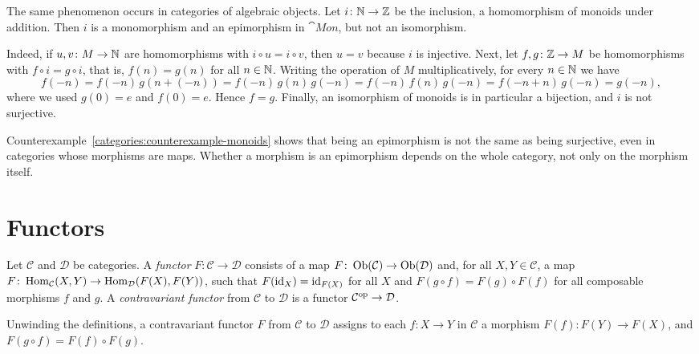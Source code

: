 \begin{counterexample}\label{categories:counterexample-monoids}
The same phenomenon occurs in categories of algebraic objects. Let
$i \colon \mathbb{N} \to \mathbb{Z}$ be the inclusion, a homomorphism of monoids under
addition. Then $i$ is a monomorphism and an epimorphism in $\cat{Mon}$, but
not an isomorphism.

Indeed, if $u, v \colon M \to \mathbb{N}$ are homomorphisms with $i \circ u = i \circ v$,
then $u = v$ because $i$ is injective. Next, let $f, g \colon \mathbb{Z} \to M$ be
homomorphisms with $f \circ i = g \circ i$, that is, $f(n) = g(n)$ for all
$n \in \mathbb{N}$. Writing the operation of $M$ multiplicatively, for every
$n \in \mathbb{N}$ we have
\[
f(-n) = f(-n) \, g(n + (-n)) = f(-n) \, g(n) \, g(-n)
= f(-n) \, f(n) \, g(-n) = f(-n + n) \, g(-n) = g(-n),
\]
where we used $g(0) = e$ and $f(0) = e$. Hence $f = g$. Finally, an isomorphism
of monoids is in particular a bijection, and $i$ is not surjective.
\end{counterexample}

\begin{remark}\label{categories:remark-epi-not-surjective}
Counterexample~\ref{categories:counterexample-monoids} shows that being an
epimorphism is not the same as being surjective, even in categories whose
morphisms are maps. Whether a morphism is an epimorphism depends on the whole
category, not only on the morphism itself.
\end{remark}

\section{Functors}\label{categories:section-functors}

\begin{definition}\label{categories:definition-functor}
Let $\mathcal{C}$ and $\mathcal{D}$ be categories. A \emph{functor}
$F \colon \mathcal{C} \to \mathcal{D}$ consists of a map
$F \colon \operatorname{Ob}(\mathcal{C}) \to \operatorname{Ob}(\mathcal{D})$ and, for all
$X, Y \in \mathcal{C}$, a map
$F \colon \operatorname{Hom}_{\mathcal{C}}(X, Y) \to \operatorname{Hom}_{\mathcal{D}}(F(X), F(Y))$, such
that $F(\mathrm{id}_X) = \mathrm{id}_{F(X)}$ for all $X$ and $F(g \circ f) = F(g) \circ F(f)$
for all composable morphisms $f$ and $g$. A \emph{contravariant functor} from
$\mathcal{C}$ to $\mathcal{D}$ is a functor
$\mathcal{C}^{\mathrm{op}} \to \mathcal{D}$.
\end{definition}

\begin{remark}\label{categories:remark-contravariant}
Unwinding the definitions, a contravariant functor $F$ from $\mathcal{C}$ to
$\mathcal{D}$ assigns to each $f \colon X \to Y$ in $\mathcal{C}$ a morphism
$F(f) \colon F(Y) \to F(X)$, and $F(g \circ f) = F(f) \circ F(g)$.
\end{remark}

